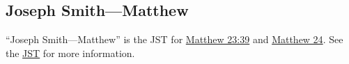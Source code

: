 \subsection{Joseph Smith---Matthew}
	\label{JSMATTHEW}
	
	``Joseph Smith---Matthew'' is the JST for \hyperref[MATTHEW-23-29]{Matthew 23:39} and \hyperref[MATTHEW-24]{Matthew 24}. See the \hyperref[JST]{JST} for more information.